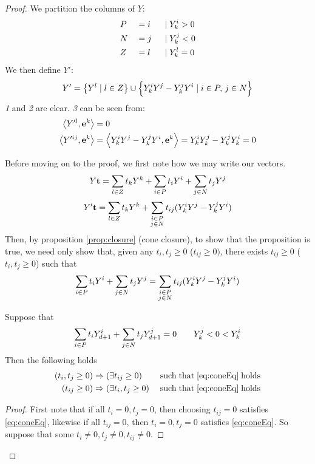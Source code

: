 \begin{proof}
	We partition the columns of $ Y$:
	\begin{alignat*}{3}
		 & P &  & = i \; & \;|\; & Y^i_{k} > 0 \\
		 & N &  & = j \; & \;|\; & Y^j_{k} < 0 \\
		 & Z &  & = l \; & \;|\; & Y^l_{k} = 0
	\end{alignat*}
	We then define $ Y'$:
	\[  Y' = \left\{ Y^l \;|\; l \in Z\right\} \cup
		\left\{Y^i_{k} Y^j - Y^j_{k} Y^i \;|\; i \in P,\, j\in N\right\} \]
	\textit{1} and \textit{2} are clear.  \textit{3} can be seen from:
	\begin{align}
		\left\langle Y'^l, \mathbf{e}^k \right\rangle    & = 0 \nonumber                                                                \\
		\left\langle Y'^{ij}, \mathbf{e}^k \right\rangle & = \left\langle Y^i_{k} Y^j - Y^j_{k} Y^i, \mathbf{e}^k \right\rangle = Y^i_{k} Y^j_{k} - Y^j_{k} Y^i_{k} = 0 \label{eq:hdropZrows}
	\end{align}

	Before moving on to the proof, we first note how we may write our vectors.
	\[  Y\mathbf{t} = \sum_{l\in Z} t_k  Y^k + \sum_{i\in P} t_i  Y^i + \sum_{j\in N} t_j  Y^j \]
	\[  Y'\mathbf{t} = \sum_{l\in Z} t_k  Y^k + \sum_{\substack{i\in P \\ j\in N}} t_{ij} (Y^i_{k} Y^j - Y^j_{k} Y^i) \]
	Then, by proposition \ref{prop:closure} (cone closure), to show that the proposition is true, we need only show that, given any $t_i, t_j \geq 0$ ($t_{ij} \geq 0)$, there exists $t_{ij} \geq 0$ ($t_i, t_j \geq 0$) such that
	\begin{equation} \label{eq:coneEq}
		\sum_{i\in P} t_i  Y^i + \sum_{j\in N} t_j  Y^j = \sum_{\substack{i\in P \\ j\in N}} t_{ij} (Y^i_{k} Y^j - Y^j_{k} Y^i)
	\end{equation}
	\begin{Prop}{
			Suppose that
			\[ \sum_{i\in P} t_i  Y^i_{d+1} + \sum_{j\in N} t_j  Y^j_{d+1} = 0\quad\quad Y^j_{k} < 0 < Y^i_{k} \]
			Then the following holds
			\begin{alignat*}{2}
				(t_i, t_j \geq 0) & \Rightarrow (\exists t_{ij} \geq 0)
				                  &                                       & \mathrm{\;such\; that\; \eqref{eq:coneEq}\; holds} \\
				(t_{ij} \geq 0)   & \Rightarrow (\exists t_i, t_j \geq 0)
				                  &                                       & \mathrm{\;such\; that\; \eqref{eq:coneEq}\; holds}
			\end{alignat*}
		}\end{Prop}
	\begin{proof}
		First note that if all $t_i = 0,t_j = 0$, then choosing $t_{ij} = 0$ satisfies \eqref{eq:coneEq}, likewise if all $t_{ij} = 0$, then $t_i = 0, t_j = 0$ satisfies \eqref{eq:coneEq}.  So suppose that some $t_i \neq 0, t_j \neq 0, t_{ij} \neq 0$.


\end{proof}
\end{proof}
